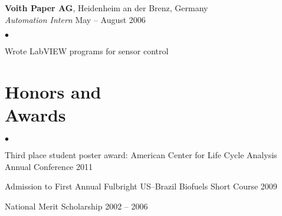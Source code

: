\documentclass[margin,line,10pt]{res}
\newenvironment{list2}{
  \begin{list}{$\bullet$}{%
      \setlength{\itemsep}{0in}
      \setlength{\parsep}{0in} \setlength{\parskip}{0in}
      \setlength{\topsep}{0in} \setlength{\partopsep}{0in} 
      \setlength{\leftmargin}{0.2in}}}{\end{list}}
\begin{document}
\begin{resume}
{\bf Voith Paper AG}, Heidenheim an der Brenz, Germany\\
\vspace{-.3cm}
{\em Automation Intern} \hfill May -- August 2006\\
\begin{list2}
\item Wrote LabVIEW programs for sensor control
\end{list2}

\section{\sc Honors and\\Awards} 
\begin{list2}
\item Third place student poster award: American Center for
Life Cycle Analysis Annual Conference \hfill 2011
\item Admission to First Annual Fulbright US--Brazil Biofuels Short Course \hfill 2009
\item National Merit Scholarship			\hfill 2002 -- 2006\\
\end{list2}

\vspace*{-.2in}




\end{resume}
\end{document}
